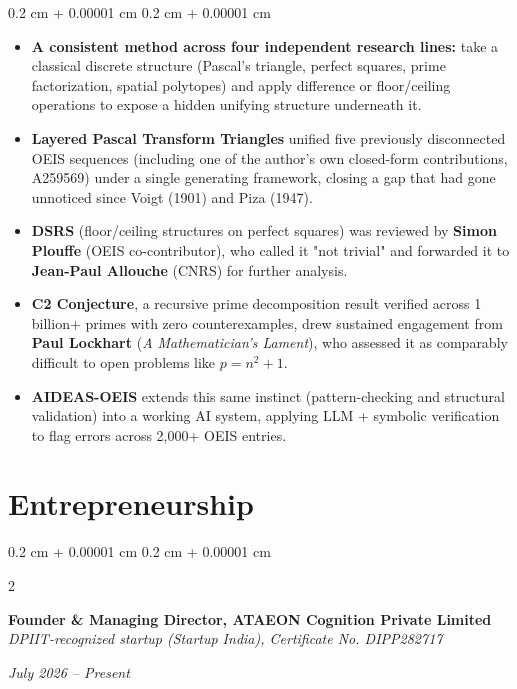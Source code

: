 \documentclass[10pt, letterpaper]{article}
\newenvironment{highlights}{
    \begin{itemize}[
        topsep=0.10 cm,
        parsep=0.10 cm,
        partopsep=0pt,
        itemsep=0pt,
        leftmargin=0.4 cm + 10pt
    ]
}{
    \end{itemize}
} %
\newenvironment{onecolentry}{
    \begin{adjustwidth}{
        0.2 cm + 0.00001 cm
    }{
        0.2 cm + 0.00001 cm
    }
}{
    \end{adjustwidth}
} %
\newenvironment{twocolentry}[2][]{
    \onecolentry
    \def\secondColumn{#2}
    \setcolumnwidth{\fill, 4.5 cm}
    \begin{paracol}{2}
}{
    \switchcolumn \raggedleft \secondColumn
    \end{paracol}
    \endonecolentry
} %
\begin{document}
    \begin{onecolentry}
        \begin{highlights}
            \item \textbf{A consistent method across four independent research lines:} take a classical discrete structure (Pascal's triangle, perfect squares, prime factorization, spatial polytopes) and apply difference or floor/ceiling operations to expose a hidden unifying structure underneath it.
            \item \textbf{Layered Pascal Transform Triangles} unified five previously disconnected OEIS sequences (including one of the author's own closed-form contributions, A259569) under a single generating framework, closing a gap that had gone unnoticed since Voigt (1901) and Piza (1947).
            \item \textbf{DSRS} (floor/ceiling structures on perfect squares) was reviewed by \textbf{Simon Plouffe} (OEIS co-contributor), who called it "not trivial" and forwarded it to \textbf{Jean-Paul Allouche} (CNRS) for further analysis.
            \item \textbf{C2 Conjecture}, a recursive prime decomposition result verified across 1 billion+ primes with zero counterexamples, drew sustained engagement from \textbf{Paul Lockhart} (\textit{A Mathematician's Lament}), who assessed it as comparably difficult to open problems like $p = n^2+1$.
            \item \textbf{AIDEAS-OEIS} extends this same instinct (pattern-checking and structural validation) into a working AI system, applying LLM + symbolic verification to flag errors across 2,000+ OEIS entries.
        \end{highlights}
    \end{onecolentry}
    
\section{Entrepreneurship}

\begin{twocolentry}{
    \textit{July 2026 – Present}}
    \textbf{Founder \& Managing Director, ATAEON Cognition Private Limited} \\
    \textit{DPIIT-recognized startup (Startup India), Certificate No. DIPP282717}
\end{twocolentry}

\vspace{0.10 cm}
\end{document}
